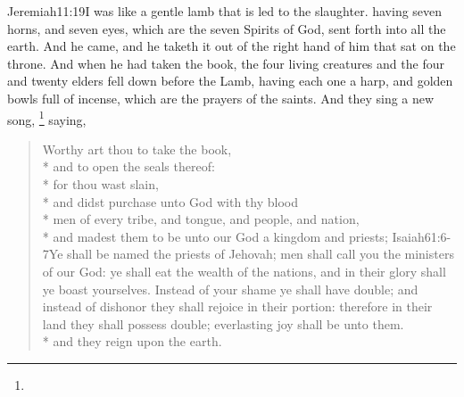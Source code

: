 					  {Jeremiah}{11:19}{I was like a gentle lamb that is led to the slaughter.} %
having seven horns, and seven eyes, which are the seven Spirits of God, sent forth into all the earth.%
And he came, and he taketh it out of the right hand of him that sat on the throne. %
And when he had taken the book, the four living creatures and the four and twenty elders fell down before the Lamb, having each one a harp, and golden bowls full of incense, which are the prayers of the saints.%
And they sing a new song,%
	\footnote{ %
	} %
saying,
\begin{verse}
Worthy art thou to take the book,\\*
\vin and to open the seals thereof:\\* 
for thou wast slain,\\*
\vin and didst purchase unto God with thy blood\\* 
\vin men of every tribe, and tongue, and people, and nation,\\* %
and madest them to be unto our God a kingdom and priests;%
				{Isaiah}{61:6-7}{Ye shall be named the priests of Jehovah; men shall call you the ministers of our God: ye shall eat the wealth of the nations, and in their glory shall ye boast yourselves. Instead of your shame ye shall have double; and instead of dishonor they shall rejoice in their portion: therefore in their land they shall possess double; everlasting joy shall be unto them.}\\*
\vin and they reign upon the earth.
\end{verse}

